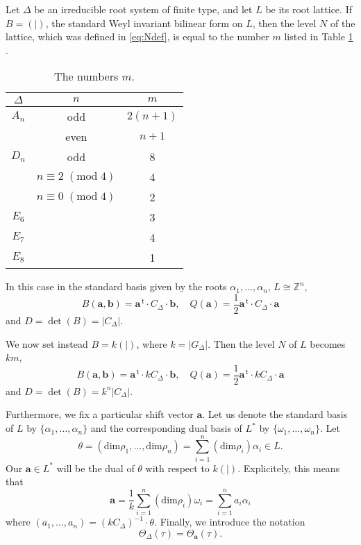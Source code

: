 \documentclass{article}
\theoremstyle{definition}
\newcommand{\ZZ} {{\mathbb Z}}		%
\renewcommand{\top}{\,\mathsf{t}}
\begin{document}
Let $\Delta$ be an irreducible root system of finite type, and let $L$ be its root lattice. If $B=(|)$, the standard Weyl invariant bilinear form on $L$, then the level $N$ of the lattice, which was defined in \eqref{eq:Ndef}, is equal to
the number $m$ listed in Table \ref{table:congorder} \cite[page 261]{kac1994infinite}. 
\begin{table}
	\begin{center}
	\begin{tabular}{ |c|c|c| }
		\hline
		$\Delta$ & $n$ & $m$ \\
		\hline
		$A_n$ & odd & $2(n+1)$ \\
		& even & $n+1$ \\
		$D_n$ & odd & 8 \\
		& $n \equiv 2\;(\mathrm{mod}\;4)$ & 4 \\
		& $n \equiv 0\;(\mathrm{mod}\;4)$ & 2 \\
		$E_6$ & & 3 \\
		$E_7$ & & 4 \\
		$E_8$ & & 1 \\
		\hline
	\end{tabular}
	\vspace{0.2in}
	\caption{The numbers $m$.}
		\label{table:congorder}
\end{center}
\end{table}
In this case in the
standard basis given by the roots $\alpha_1,\dots,\alpha_n$, $L\cong  \ZZ^n$,
\[ B(\mathbf{a},\mathbf{b})=\mathbf{a}^{\top}\cdot C_{\Delta} \cdot \mathbf{b}, 
\quad Q(\mathbf{a})=\frac{1}{2}\mathbf{a}^{\top}\cdot C_{\Delta} \cdot \mathbf{a} \]
and $D=\det(B)=|C_{\Delta}|$.


We now set instead $B=k(|)$, where $k=|G_{\Delta}|$. 
Then the level $N$ of $L$ becomes $km$,
\[ B(\mathbf{a},\mathbf{b})=\mathbf{a}^{\top}\cdot kC_{\Delta} \cdot \mathbf{b}, 
\quad Q(\mathbf{a})=\frac{1}{2}\mathbf{a}^{\top}\cdot kC_{\Delta} \cdot \mathbf{a} \]
and $D=\det(B)=k^n|C_{\Delta}|$.

Furthermore, we fix a particular shift vector $\mathbf{a}$. Let us denote the standard basis of $L$ 
by $\{\alpha_1, \dots, \alpha_n\}$ and the corresponding dual basis of $L^{\ast}$ by 
$\{\omega_1, \dots, \omega_n\}$.
Let
\begin{equation} 
\label{eq:thetadef}
\theta=( \mathrm{dim} \rho_1 ,\dots, \mathrm{dim} \rho_n) = \sum_{i=1}^n 
(\mathrm{dim} \rho_i) \alpha_i \in L.\end{equation}
Our $\mathbf{a} \in L^{\ast}$ will be the dual of $\theta$ with respect to $k(|)$. 
Explicitely, this means that
\begin{equation}
\mathbf{a}= \frac{1}{k}\sum_{i=1}^n (\mathrm{dim} \rho_i) 
\omega_i=\sum_{i=1}^n a_i \alpha_i 
\label{eq:zetasub}
\end{equation}
where $(a_1,\dots,a_n)=(kC_\Delta)^{-1} \cdot \theta$.
Finally, we introduce the notation
\[ \Theta_{\Delta}(\tau)=\Theta_{\mathbf{a}}(\tau). \]
\end{document}
